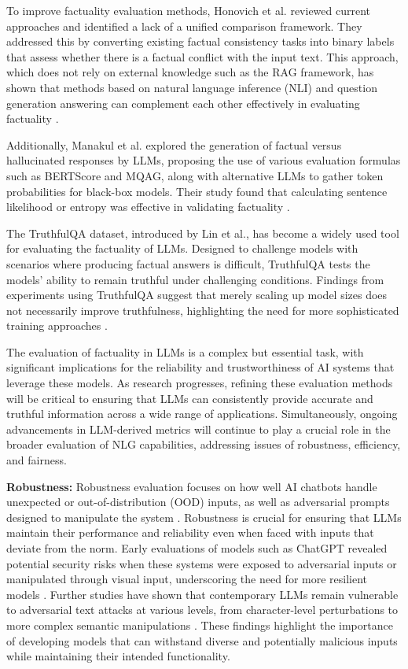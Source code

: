 To improve factuality evaluation methods, Honovich et al. reviewed current approaches and identified a lack of a unified comparison framework. They addressed this by converting existing factual consistency tasks into binary labels that assess whether there is a factual conflict with the input text. This approach, which does not rely on external knowledge such as the RAG framework, has shown that methods based on natural language inference (NLI) and question generation answering can complement each other effectively in evaluating factuality \cite{honovich2022true}.

Additionally, Manakul et al. explored the generation of factual versus hallucinated responses by LLMs, proposing the use of various evaluation formulas such as BERTScore and MQAG, along with alternative LLMs to gather token probabilities for black-box models. Their study found that calculating sentence likelihood or entropy was effective in validating factuality \cite{manakul2023selfcheckgpt}.

The TruthfulQA dataset, introduced by Lin et al., has become a widely used tool for evaluating the factuality of LLMs. Designed to challenge models with scenarios where producing factual answers is difficult, TruthfulQA tests the models' ability to remain truthful under challenging conditions. Findings from experiments using TruthfulQA suggest that merely scaling up model sizes does not necessarily improve truthfulness, highlighting the need for more sophisticated training approaches \cite{lin2021truthfulqa}.

The evaluation of factuality in LLMs is a complex but essential task, with significant implications for the reliability and trustworthiness of AI systems that leverage these models. As research progresses, refining these evaluation methods will be critical to ensuring that LLMs can consistently provide accurate and truthful information across a wide range of applications. Simultaneously, ongoing advancements in LLM-derived metrics will continue to play a crucial role in the broader evaluation of NLG capabilities, addressing issues of robustness, efficiency, and fairness.

\textbf{Robustness:} Robustness evaluation focuses on how well AI chatbots handle unexpected or out-of-distribution (OOD) inputs, as well as adversarial prompts designed to manipulate the system \cite{wang2022generalizing}. Robustness is crucial for ensuring that LLMs maintain their performance and reliability even when faced with inputs that deviate from the norm. Early evaluations of models such as ChatGPT revealed potential security risks when these systems were exposed to adversarial inputs or manipulated through visual input, underscoring the need for more resilient models \cite{yang2022glue}. Further studies have shown that contemporary LLMs remain vulnerable to adversarial text attacks at various levels, from character-level perturbations to more complex semantic manipulations \cite{zhu2023promptbench}. These findings highlight the importance of developing models that can withstand diverse and potentially malicious inputs while maintaining their intended functionality.

